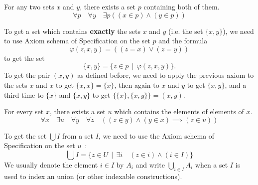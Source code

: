 \begin{axiom} \label{axiom-of-pairing}
    For any two sets $x$ and $y$, there exists a set $p$ containing both of them.
    \[
        \forall p \quad \forall y \quad \exists p ( (x \in p) \land (y \in p) )
    \]
\end{axiom}

\begin{remark}
    To get a set which contains \textbf{exactly} the sets $x$ and $y$ (i.e. the set $\{x,y\}$), we need to use Axiom schema of Specification on the set $p$ and the formula 
    \[
        \varphi(z,x,y) = ((z = x) \vee (z = y))
    \]
    to get the set
    \[
        \{x,y\} = \{ z \in p \, \mid \, \varphi(z,x,y) \}.    
    \]
    To get the pair $(x,y)$ as defined before, we need to apply the previous axiom to the sets $x$ and $x$ to get $\{x,x\} = \{x\}$, then again to $x$ and $y$ to get $\{x,y\}$, and a third time to $\{x\}$ and $\{x,y\}$ to get $\{\{x\}, \{x,y\}\} = (x,y)$.
\end{remark}

\begin{axiom}
    For every set $x$, there exists a set $u$ which contains the elements of elements of $x$. 
    \[
        \forall x \quad \exists u \quad \forall y \quad \forall z \quad ( (z \in y) \land (y \in x) \implies (z \in u) )
    \]
\end{axiom}

\begin{remark}
    To get the set $\bigcup I$ from a set $I$, we need to use the Axiom schema of Specification on the set $u$~:
    \[
        \bigcup I = \{ z \in U \, \mid \, \exists i \quad (z \in i) \land (i \in I) \}    
    \]
    We usually denote the element $i \in I$ by $A_i$ and write $\bigcup_{i \in I} A_i$ when a set $I$ is used to index an union (or other indexable constructions).
\end{remark}

